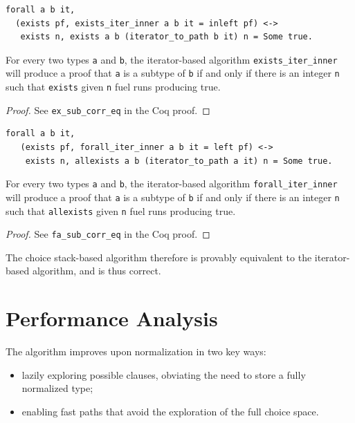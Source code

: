 \documentclass[a4paper,english]{lipics-v2019}
\begin{document}
\begin{lemma}
\begin{small}\begin{verbatim}
forall a b it, 
  (exists pf, exists_iter_inner a b it = inleft pf) <->
   exists n, exists a b (iterator_to_path b it) n = Some true.
\end{verbatim}\end{small}
For every two types \verb|a| and \verb|b|, the iterator-based algorithm
\verb|exists_iter_inner| will produce a proof that \verb|a| is a subtype
of \verb|b| if and only if there is an integer \verb|n| such that
 \verb|exists| given \verb|n| fuel runs producing true.
\end{lemma}
\begin{proof}
See \verb|ex_sub_corr_eq| in the Coq proof.
\end{proof}

\begin{lemma}
\begin{small}\begin{verbatim}
forall a b it,
   (exists pf, forall_iter_inner a b it = left pf) <->
    exists n, allexists a b (iterator_to_path a it) n = Some true.
\end{verbatim}
\end{small}  
For every two types \verb|a| and \verb|b|, the iterator-based algorithm
\verb|forall_iter_inner| will produce a proof that \verb|a| is a subtype
of \verb|b| if and only if there is an integer \verb|n| such that
 \verb|allexists| given \verb|n| fuel runs producing true.
\end{lemma}
\begin{proof}
See \verb|fa_sub_corr_eq| in the Coq proof.
\end{proof}

The choice stack-based algorithm therefore is provably equivalent to the
iterator-based algorithm, and is thus correct.

\section{Performance Analysis}

The algorithm improves upon normalization in two key ways:
\begin{itemize}
  \item lazily exploring possible clauses, obviating the need to store a fully normalized type;
  \item enabling fast paths that avoid the exploration of the full choice space.
\end{itemize}
\end{document}
